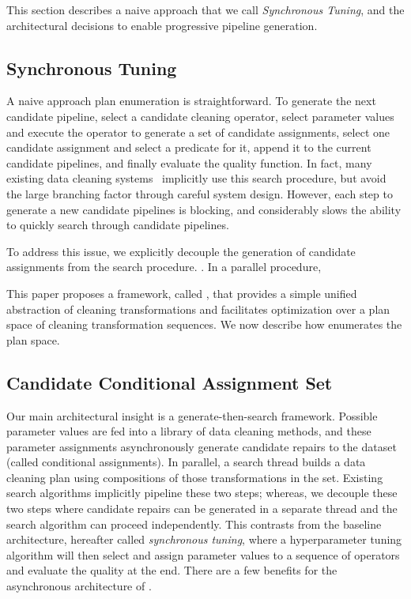 

This section describes a naive approach that we call {\it Synchronous Tuning}, and the architectural decisions to enable progressive pipeline generation.


\subsection{Synchronous Tuning}

A naive approach plan enumeration is straightforward.  To generate the next candidate pipeline, select a candidate cleaning operator, select parameter values and execute the operator to generate a set of candidate assignments, select one candidate assignment and select a predicate for it, append it to the current candidate pipelines, and finally evaluate the quality function.  In fact, many existing data cleaning systems~\cite{} implicitly use this search procedure, but avoid the large branching factor through careful system design.    However, each step to generate a new candidate pipelines is blocking, and considerably slows the ability to quickly search through candidate pipelines.  

To address this issue, we explicitly decouple the generation of candidate assignments from the search procedure.  \sys .  In a parallel procedure, 

This paper proposes a framework, called \sys, that provides a simple unified abstraction of cleaning transformations and facilitates optimization over a plan space of cleaning transformation sequences.
We now describe how \sys enumerates the plan space.

\subsection{Candidate Conditional Assignment Set}
Our main architectural insight is a generate-then-search framework.
Possible parameter values are fed into a library of data cleaning methods, and these parameter assignments asynchronously generate candidate repairs to the dataset (called conditional assignments).
In parallel, a search thread builds a data cleaning plan using compositions of those transformations in the set. 
Existing search algorithms implicitly pipeline these two steps; whereas, we decouple these two steps where candidate repairs can be generated in a separate thread and the search algorithm can proceed independently.
This contrasts from the baseline architecture, hereafter called \emph{synchronous tuning}, where a hyperparameter tuning algorithm will then select and assign parameter values to a sequence of operators and evaluate the quality at the end. 
There are a few benefits for the asynchronous architecture of \sys.

